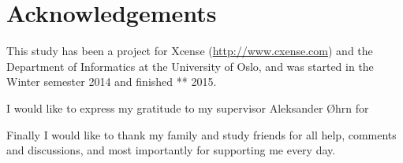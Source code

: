 \chapter*{Acknowledgements}
This study has been a project for Xcense (\url{http://www.cxense.com}) and the Department of Informatics at the University of Oslo, and was started in the Winter semester  2014 and finished ** 2015. 

I would like to express my gratitude to my supervisor Aleksander Øhrn for 

Finally I would like to thank my family and study friends for all help, comments and discussions, and most importantly for supporting me every day.